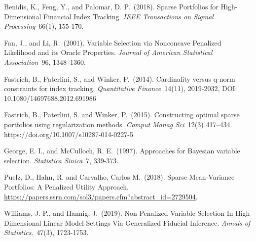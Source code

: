 \documentclass[a4paper, 12pt]{article}
\theoremstyle{plain}
\theoremstyle{definition}
\theoremstyle{remark}
\begin{document}
\begin{description}

\item{} Benidis, K., Feng, Y., and Palomar, D. P.~(2018). Sparse Portfolios for High-Dimensional Financial Index Tracking. \emph{IEEE Transactions on Sigmal Processing}~66(1), 155-170.

\item{} Fan, J., and Li, R.~(2001). Variable Selection via Nonconcave Penalized Likelihood and its
Oracle Properties. \emph{Journal of American Statistical Association}~96, 1348–1360.

\item{} Fastrich, B., Paterlini, S., and Winker, P.~(2014). Cardinality versus q-norm constraints for index tracking. \emph{Quantitative Finance}~14(11), 2019-2032, DOI: 10.1080/14697688.2012.691986

\item{} Fastrich, B., Paterlini, S. and Winker, P.~(2015). Constructing optimal sparse portfolios using regularization methods. \emph{Comput Manag Sci}~12(3) 417–434. https://doi.org/10.1007/s10287-014-0227-5

\item{} George, E. I., and McCulloch, R. E.~(1997). Approaches for Bayesian variable selection. \emph{Statistica Sinica}~7, 339-373.

\item{} Puelz, D., Hahn, R. and Carvalho, Carlos M.~(2018). Sparse Mean-Variance Portfolios: A Penalized Utility Approach. \url{https://papers.ssrn.com/sol3/papers.cfm?abstract_id=2729504}.

\item{} Williams, J. P., and Hannig, J.~(2019). Non-Penalized Variable Selection In High-Dimensional Linear Model Settings Via Generalized Fiducial Inference. \emph{Annals of Statistics}.~47(3), 1723-1753. 

\end{description}
\end{document}
